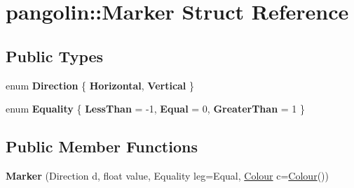 \hypertarget{structpangolin_1_1_marker}{}\section{pangolin\+:\+:Marker Struct Reference}
\label{structpangolin_1_1_marker}
\subsection*{Public Types}
\begin{DoxyCompactItemize}
\item 
enum {\bfseries Direction} \{ {\bfseries Horizontal}, 
{\bfseries Vertical}
 \}\hypertarget{structpangolin_1_1_marker_a1f53af7b3403a08f920f013c1d3dccaa}{}\label{structpangolin_1_1_marker_a1f53af7b3403a08f920f013c1d3dccaa}

\item 
enum {\bfseries Equality} \{ {\bfseries Less\+Than} = -\/1, 
{\bfseries Equal} = 0, 
{\bfseries Greater\+Than} = 1
 \}\hypertarget{structpangolin_1_1_marker_a3d67b40df94c6cd17eacdc9b1d74f1f4}{}\label{structpangolin_1_1_marker_a3d67b40df94c6cd17eacdc9b1d74f1f4}

\end{DoxyCompactItemize}
\subsection*{Public Member Functions}
\begin{DoxyCompactItemize}
\item 
{\bfseries Marker} (Direction d, float value, Equality leg=Equal, \hyperlink{structpangolin_1_1_colour}{Colour} c=\hyperlink{structpangolin_1_1_colour}{Colour}())\hypertarget{structpangolin_1_1_marker_ab2c7bf7d05b62f2b862f8d3427849746}{}\label{structpangolin_1_1_marker_ab2c7bf7d05b62f2b862f8d3427849746}

\end{DoxyCompactItemize}
